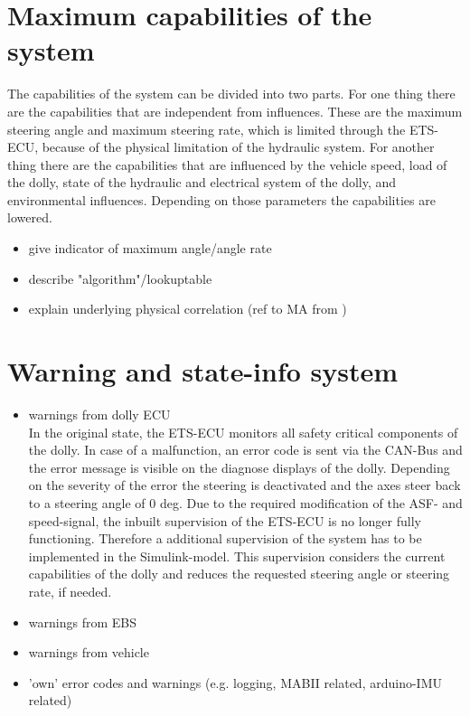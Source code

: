 \documentclass[ExampleMasters.tex]{subfiles}
\begin{document}
\section{Maximum capabilities of the system}
\label{sec:maxi_capabilities}
The capabilities of the system can be divided into two parts. For one thing there are the capabilities that are independent from influences. These are the maximum steering angle and maximum steering rate, which is limited through the ETS-ECU, because of the physical limitation of the hydraulic system.
For another thing there are the capabilities that are influenced by the vehicle speed, load of the dolly, state of the hydraulic and electrical system of the dolly, and environmental influences.
Depending on those parameters the capabilities are lowered.
\begin{itemize}
	\item give indicator of maximum angle/angle rate
	\item describe "algorithm"/lookuptable
	\item explain underlying physical correlation (ref to MA from )
\end{itemize}

\section{Warning and state-info system}
\label{sec:warning_system}
\begin{itemize}
	\item warnings from dolly ECU \\
	In the original state, the ETS-ECU monitors all safety critical components of the dolly. In case of a malfunction, an error code is sent via the CAN-Bus and the error message is visible on the diagnose displays of the dolly. Depending on the severity of the error the steering is deactivated and the axes steer back to a steering angle of 0 deg.
	Due to the required modification of the ASF- and speed-signal, the inbuilt supervision of the ETS-ECU is no longer fully functioning. Therefore a additional supervision of the system has to be implemented in the Simulink-model. This supervision considers the current capabilities of the dolly and reduces the requested steering angle or steering rate, if needed.    
	\item warnings from EBS
	\item warnings from vehicle
	\item 'own' error codes and warnings (e.g. logging, MABII related, arduino-IMU related)
\end{itemize}
\end{document}
